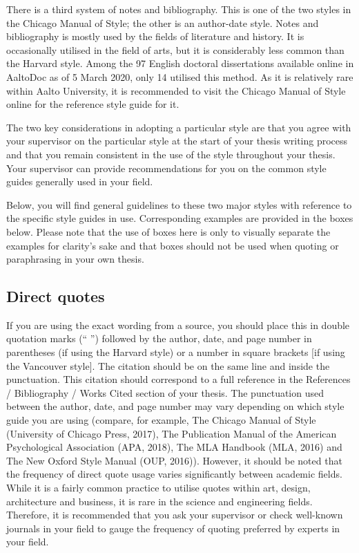\documentclass[english, 12pt, a4paper, biz, utf8, a-2b, online]{aaltothesis}
\begin{document}
There is a third system of notes and bibliography. This is one of the two styles
in the Chicago Manual of Style; the other is an author-date style. Notes and 
bibliography is mostly used by the fields of literature and history. It is 
occasionally utilised in the field of arts, but it is considerably less common 
than the Harvard style. Among the 97 English doctoral dissertations available 
online in AaltoDoc as of 5 March 2020, only 14 utilised this method. As it is 
relatively rare within Aalto University, it is recommended to visit the Chicago 
Manual of Style online for the reference style guide for it.

The two key considerations in adopting a particular style are that you agree 
with your supervisor on the particular style at the start of your thesis writing
process and that you remain consistent in the use of the style throughout your 
thesis. Your supervisor can provide recommendations for you on the common style 
guides generally used in your field.

Below, you will find general guidelines to these two major styles with reference
to the specific style guides in use. Corresponding examples are provided in the 
boxes below. Please note that the use of boxes here is only to visually separate
the examples for clarity’s sake and that boxes should not be used when quoting 
or paraphrasing in your own thesis.


\subsection*{Direct quotes}

If you are using the exact wording from a source, you should place this in 
double quotation marks (“ ”) followed by the author, date, and page number in 
parentheses (if using the Harvard style) or a number in square brackets [if 
using the Vancouver style]. The citation should be on the same line and inside 
the punctuation. This citation should correspond to a full reference in the 
References / Bibliography / Works Cited section of your thesis. The punctuation 
used between the author, date, and page number may vary depending on which style
guide you are using (compare, for example, The Chicago Manual of Style 
(University of Chicago Press, 2017), The Publication Manual of the American 
Psychological Association (APA, 2018), The MLA Handbook (MLA, 2016) and The New 
Oxford Style Manual (OUP, 2016)). However, it should be noted that the frequency
of direct quote usage varies significantly between academic fields. While it is 
a fairly common practice to utilise quotes within art, design, architecture and 
business, it is rare in the science and engineering fields. Therefore, it is 
recommended that you ask your supervisor or check well-known journals in your 
field to gauge the frequency of quoting preferred by experts in your field.
\end{document}
